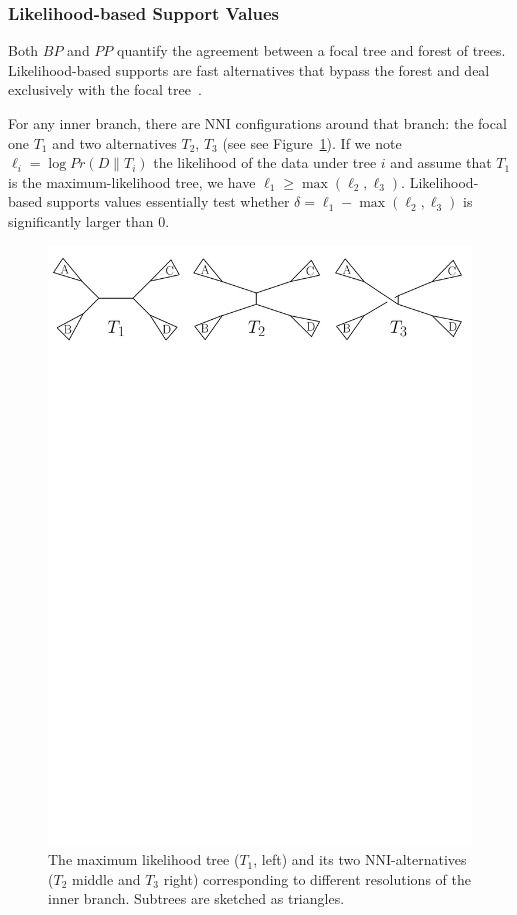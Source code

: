 \subsubsection{Likelihood-based Support Values} \label{sec:other-confidence}

Both $BP$ and $PP$ quantify the agreement between a focal tree and forest of trees. Likelihood-based supports are fast alternatives that bypass the forest and deal exclusively with the focal tree~\citep{Anisimova2006}. 

For any inner branch, there are NNI configurations around that branch: the focal one $T_1$ and two alternatives $T_2$, $T_3$ (see see Figure~\ref{fig:nni}). If we note $\ell_i = \log Pr(D \| T_i)$ the likelihood of the data under tree $i$ and assume that $T_1$ is the maximum-likelihood tree, we have $\ell_1 \geq \max(\ell_2, \ell_3)$. Likelihood-based supports values essentially test whether $\delta = \ell_1 - \max(\ell_2, \ell_3)$ is significantly larger than $0$. 

\begin{figure}
 \includegraphics[width=0.9\linewidth]{Figs/NNI}
 \caption{The maximum likelihood tree ($T_1$, left) and its two NNI-alternatives ($T_{2}$ middle and $T_{3}$ right) corresponding to different resolutions of the inner branch. Subtrees are sketched as triangles.}
 \label{fig:nni}
\end{figure}



